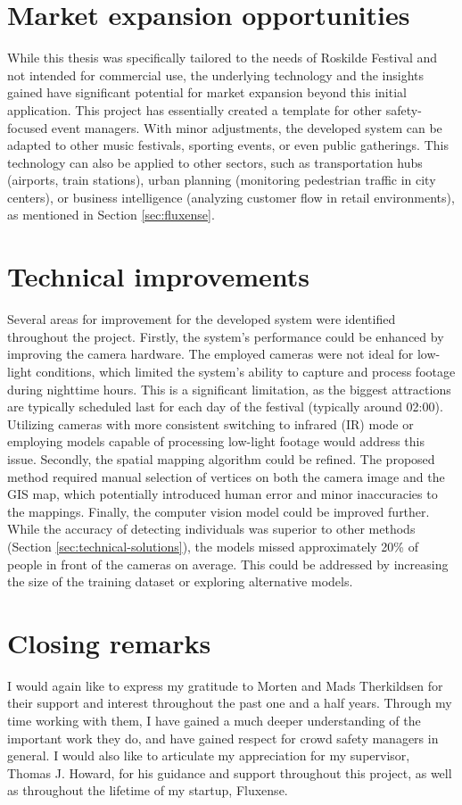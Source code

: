 \section{Market expansion opportunities}

While this thesis was specifically tailored to the needs of Roskilde Festival and not intended for commercial use, the underlying technology and the insights gained have significant potential for market expansion beyond this initial application. This project has essentially created a template for other safety-focused event managers. With minor adjustments, the developed system can be adapted to other music festivals, sporting events, or even public gatherings. This technology can also be applied to other sectors, such as transportation hubs (airports, train stations), urban planning (monitoring pedestrian traffic in city centers), or business intelligence (analyzing customer flow in retail environments), as mentioned in Section \ref{sec:fluxense}.

\section{Technical improvements}

Several areas for improvement for the developed system were identified throughout the project. Firstly, the system's performance could be enhanced by improving the camera hardware. The employed cameras were not ideal for low-light conditions, which limited the system's ability to capture and process footage during nighttime hours. This is a significant limitation, as the biggest attractions are typically scheduled last for each day of the festival (typically around 02:00). Utilizing cameras with more consistent switching to infrared (IR) mode or employing models capable of processing low-light footage would address this issue. Secondly, the spatial mapping algorithm could be refined. The proposed method required manual selection of vertices on both the camera image and the GIS map, which potentially introduced human error and minor inaccuracies to the mappings. Finally, the computer vision model could be improved further. While the accuracy of detecting individuals was superior to other methods (Section \ref{sec:technical-solutions}), the models missed approximately 20\% of people in front of the cameras on average. This could be addressed by increasing the size of the training dataset or exploring alternative models.


\section{Closing remarks}
I would again like to express my gratitude to Morten and Mads Therkildsen for their support and interest throughout the past one and a half years. Through my time working with them, I have gained a much deeper understanding of the important work they do, and have gained respect for crowd safety managers in general. I would also like to articulate my appreciation for my supervisor, Thomas J. Howard, for his guidance and support throughout this project, as well as throughout the lifetime of my startup, Fluxense.